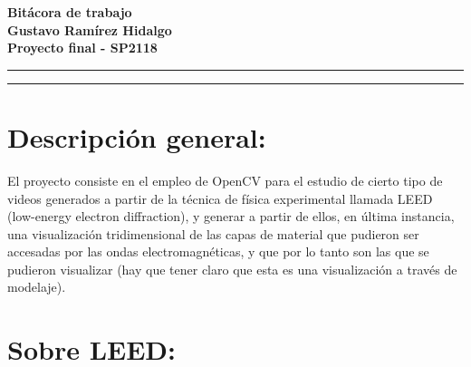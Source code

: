 \documentclass[letter]{article}
\newcommand{\entitle}[1]{
  \vspace{0.3cm}%
  \noindent%
  \textbf{#1}%
  \vspace{0.2cm}%
  \hrule\vspace*{0.5mm}%
  \noindent%
  \rule{\linewidth}{0.5mm}%
  \vspace{0.5cm}%
}%
\begin{document}

\newcommand{\uic}{blue} %
\newcommand{\uim}{\_\_} %
\newcommand{\userinput}[1]{\textcolor{\uic}{\uim#1\uim}}
























\begin{center}
\entitle{Bitácora de trabajo \\ Gustavo Ramírez Hidalgo \\ Proyecto final - SP2118}
\end{center}


\section{\normalsize Descripción general:}
El proyecto consiste en el empleo de OpenCV para el estudio de cierto tipo de videos generados a partir de la técnica de física experimental llamada LEED (low-energy electron diffraction), y generar a partir de ellos, en última instancia, una visualización tridimensional de las capas de material que pudieron ser accesadas por las ondas electromagnéticas, y que por lo tanto son las que se pudieron visualizar (hay que tener claro que esta es una visualización a través de modelaje).


\section{\normalsize Sobre LEED:}
\end{document}
